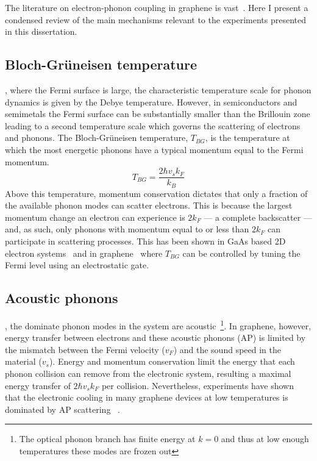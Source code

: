 The literature on electron-phonon coupling in graphene is vast~\cite{sohier_phonon-limited_2014, tielrooij_out--plane_2017, viljas_electron-phonon_2010, bistritzer_electronic_2009, schiefele_temperature_2012}. Here I present a condensed review of the main mechanisms relevant to the experiments presented in this dissertation.

\subsection{Bloch-Gr{\"u}neisen temperature}
, where the Fermi surface is large, the characteristic temperature scale for phonon dynamics is given by the Debye temperature. However, in semiconductors and semimetals the Fermi surface can be substantially smaller than the Brillouin zone leading to a second temperature scale which governs the scattering of electrons and phonons. The Bloch-Gr{\"u}neisen temperature, $T_{BG}$, is the temperature at which the most energetic phonons have a typical momentum equal to the Fermi momentum\cite{bloch_zum_1930, gruneisen_abhangigkeit_1933}.
\begin{equation}\label{eq:TBG}
T_{BG} = \frac{2\hbar v_sk_F}{k_B}
\end{equation}
Above this temperature, momentum conservation dictates that only a fraction of the available phonon modes can scatter electrons. This is because the largest momentum change an electron can experience is $2k_F$ --- a complete backscatter --- and, as such, only phonons with momentum equal to or less than $2k_F$ can participate in scattering processes. This has been shown in GaAs based 2D electron systems~\cite{stormer_observation_1990} and in graphene~\cite{efetov_controlling_2010} where $T_{BG}$ can be controlled by tuning the Fermi level using an electrostatic gate.

\subsection{Acoustic phonons}
, the dominate phonon modes in the system are acoustic~\cite{ashcroft_solid_1976}\footnote{The optical phonon branch has finite energy at $k=0$ and thus at low enough temperatures these modes are frozen out}. In graphene, however, energy transfer between electrons and these acoustic phonons (AP) is limited by the mismatch between the Fermi velocity ($v_F$) and the sound speed in the material ($v_s$). Energy and momentum conservation limit the energy that each phonon collision can remove from the electronic system, resulting a maximal energy transfer of $2\hbar v_sk_F$ per collision. Nevertheless, experiments have shown that the electronic cooling in many graphene devices at low temperatures is dominated by AP scattering~\cite{fong_measurement_2013, betz_supercollision_2013, graham_photocurrent_2013} .

